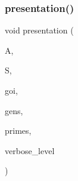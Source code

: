 \mbox{\label{analyze__group_8_c_ab037817a46d85b5e20c048f5e8382118}} 
\subsubsection{\texorpdfstring{presentation()}{presentation()}}
{\footnotesize\ttfamily void presentation (\begin{DoxyParamCaption}\item[{\mbox{\hyperlink{classaction}{action}} $\ast$}]{A,  }\item[{\mbox{\hyperlink{classsims}{sims}} $\ast$}]{S,  }\item[{\mbox{\hyperlink{galois_8h_a09fddde158a3a20bd2dcadb609de11dc}{I\+NT}}}]{goi,  }\item[{\mbox{\hyperlink{classvector__ge}{vector\+\_\+ge}} $\ast$}]{gens,  }\item[{\mbox{\hyperlink{galois_8h_a09fddde158a3a20bd2dcadb609de11dc}{I\+NT}} $\ast$}]{primes,  }\item[{\mbox{\hyperlink{galois_8h_a09fddde158a3a20bd2dcadb609de11dc}{I\+NT}}}]{verbose\+\_\+level }\end{DoxyParamCaption})}

